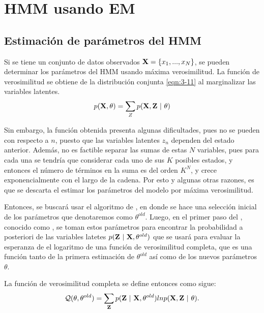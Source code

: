
\chapter{HMM usando EM} \label{ch:chap3}

\section{Estimación de parámetros del HMM}

Si se tiene un conjunto de datos observados $\textbf{X} = \lbrace x_1, ..., x_N \rbrace$, se pueden determinar los parámetros del HMM usando máxima verosimilitud. La función de verosimilitud se obtiene de la distribución conjunta \eqref{eqn:3-11} al marginalizar las variables latentes.
\begin{equation}
  p(\textbf{X}, \theta) = \sum_Z p(\textbf{X}, \textbf{Z} ~|~ \theta)
\label{eqn:3-12}
\end{equation}

Sin embargo, la función obtenida presenta algunas dificultades, pues no se pueden con respecto a $n$, puesto que las variables latentes $z_n$ dependen  del estado anterior. Además, no es factible separar las sumas de estas $N$ variables, pues para cada una se tendría que considerar cada uno de sus $K$ posibles estados, y entonces el número de términos en la suma es del orden $K^N$, y crece exponencialmente con el largo de la cadena. Por esto y algunas otras razones, es que se descarta el estimar los parámetros del modelo por máxima verosimilitud.

Entonces, se buscará usar el algoritmo de \aem, en donde se hace una selección inicial de los parámetros que denotaremos como $\theta^{old}$. Luego, en el primer paso del \aem, conocido como \estep, se toman estos parámetros para encontrar la probabilidad a posteriori de las variables latetes $p(\textbf{Z} ~|~ \textbf{X}, \theta^{old})$ que se usará para evaluar la esperanza de el logaritmo de una función de verosimilitud completa, que es una función tanto de la primera estimación de $\theta^{old}$ así como de los nuevos parámetros $\theta$.

La función de verosimilitud completa se define entonces como sigue:
\begin{equation}
\mathcal{Q}(\theta, \theta^{old}) = 
  \sum_{\textbf{Z}} p(\textbf{Z} ~|~ \textbf{X}, \theta^{old})
  ln p(\textbf{X}, \textbf{Z} ~|~ \theta).
\label{eqn:3-13}
\end{equation}

